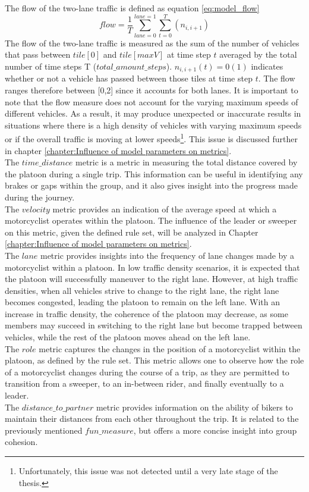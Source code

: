 The flow of the two-lane traffic is defined as equation \ref{eq:model_flow}
\begin{equation}
    flow = \frac{1}{T}\sum_{lane=0}^{lane=1}\sum_{t={0}}^{T}(n_{i, i+1})
    \label{eq:model_flow}
\end{equation}
The flow of the two-lane traffic is measured as the sum of the number of vehicles that pass between $tile[0]$  and $tile[maxV]$ at time step $t$ averaged by the total number of time steps T ($total\_amount\_steps$). $n_{i, i+1}(t) = 0(1)$ indicates whether or not a vehicle has passed between those tiles at time step $t$. The flow ranges therefore between [0,2] since it accounts for both lanes. It is important to note that the flow measure does not account for the varying maximum speeds of different vehicles. As a result, it may produce unexpected or inaccurate results in situations where there is a high density of vehicles with varying maximum speeds or if the overall traffic is moving at lower speeds\footnote{Unfortunately, this issue was not detected until a very late stage of the thesis.}. This issue is discussed further in chapter \ref{chapter:Influence of model parameters on metrics}.\\
The $time\_distance$ metric is a metric in measuring the total distance covered by the platoon during a single trip. This information can be useful in identifying any brakes or gaps within the group, and it also gives insight into the progress made during the journey.\\
The $velocity$ metric provides an indication of the average speed at which a motorcyclist operates within the platoon. The influence of the leader or sweeper on this metric, given the defined rule set, will be analyzed in Chapter \ref{chapter:Influence of model parameters on metrics}.\\
The $lane$ metric provides insights into the frequency of lane changes made by a motorcyclist within a platoon. In low traffic density scenarios, it is expected that the platoon will successfully maneuver to the right lane. However, at high traffic densities, when all vehicles strive to change to the right lane, the right lane becomes congested, leading the platoon to remain on the left lane. With an increase in traffic density, the coherence of the platoon may decrease, as some members may succeed in switching to the right lane but become trapped between vehicles, while the rest of the platoon moves ahead on the left lane.\\
The $role$ metric captures the changes in the position of a motorcyclist within the platoon, as defined by the rule set. This metric allows one to observe how the role of a motorcyclist changes during the course of a trip, as they are permitted to transition from a sweeper, to an in-between rider, and finally eventually to a leader.\\
The $distance\_to\_partner$ metric provides information on the ability of bikers to maintain their distances from each other throughout the trip. It is related to the previously mentioned $fun\_measure$, but offers a more concise insight into group cohesion.


